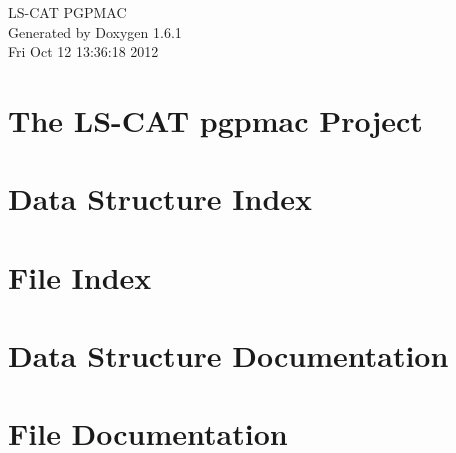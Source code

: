 \documentclass[a4paper]{book}
\begin{document}
\hypersetup{pageanchor=false}
\begin{titlepage}
\vspace*{7cm}
\begin{center}
{\Large LS-\/CAT PGPMAC }\\
\vspace*{1cm}
{\large Generated by Doxygen 1.6.1}\\
\vspace*{0.5cm}
{\small Fri Oct 12 13:36:18 2012}\\
\end{center}
\end{titlepage}
\clearemptydoublepage
{}
\tableofcontents
\clearemptydoublepage
{}
\hypersetup{pageanchor=true}
\chapter{The LS-\/CAT pgpmac Project}
\label{index}\hypertarget{index}{}
\chapter{Data Structure Index}

\chapter{File Index}

\chapter{Data Structure Documentation}










\chapter{File Documentation}






\printindex
\end{document}
